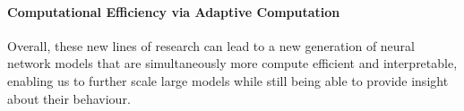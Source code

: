 \documentclass{article}
\begin{document}
\paragraph{Computational Efficiency via Adaptive Computation}

\vspace*{0.5cm}
\noindent Overall, these new lines of research can lead to a new generation of neural network models that are simultaneously more compute efficient and interpretable, enabling us to further scale large models while still being able to provide insight about their behaviour.



\end{document}
